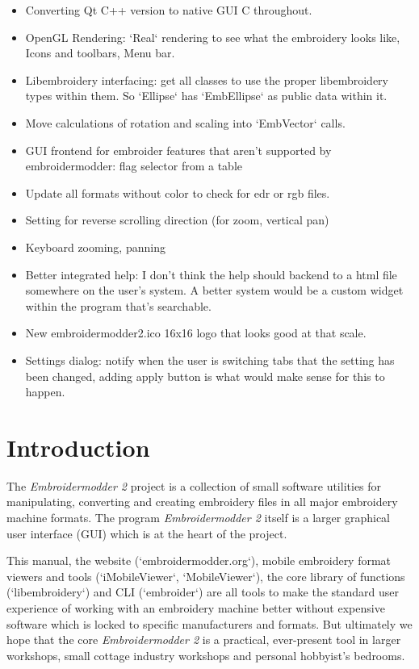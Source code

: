 \documentclass[a4paper]{report}
\begin{document}
\begin{itemize}
  \item Converting Qt C++ version to native GUI C throughout.
  \item OpenGL Rendering: `Real` rendering to see what the embroidery looks like, Icons and toolbars, Menu bar.
  \item Libembroidery interfacing: get all classes to use the proper libembroidery types within them. So `Ellipse` has `EmbEllipse` as public data within it.
  \item Move calculations of rotation and scaling into `EmbVector` calls.
  \item GUI frontend for embroider features that aren't supported by embroidermodder: flag selector from a table
  \item Update all formats without color to check for edr or rgb files.
  \item Setting for reverse scrolling direction (for zoom, vertical pan)
  \item Keyboard zooming, panning
  \item Better integrated help: I don't think the help should backend to a html file somewhere on the user's system. A better system would be a custom widget within the program that's searchable.
  \item New embroidermodder2.ico 16x16 logo that looks good at that scale.
  \item Settings dialog: notify when the user is switching tabs that the setting has been changed, adding apply button is what would make sense for this to happen.
\end{itemize}

\chapter{Introduction}

The \emph{Embroidermodder 2} project is a collection of small software utilities for
manipulating, converting and creating embroidery files in all major embroidery
machine formats. The program \textit{Embroidermodder 2} itself is a larger graphical
user interface (GUI) which is at the heart of the project.

This manual, the website (`embroidermodder.org`), mobile embroidery format viewers
and tools (`iMobileViewer`, `MobileViewer`), the core library of functions
(`libembroidery`) and CLI (`embroider`) are all tools to make the standard
user experience of working with an embroidery machine better without expensive
software which is locked to specific manufacturers and formats. But ultimately
we hope that the core \textit{Embroidermodder 2} is a practical, ever-present tool in
larger workshops, small cottage industry workshops and personal hobbyist's
bedrooms.
\end{document}
